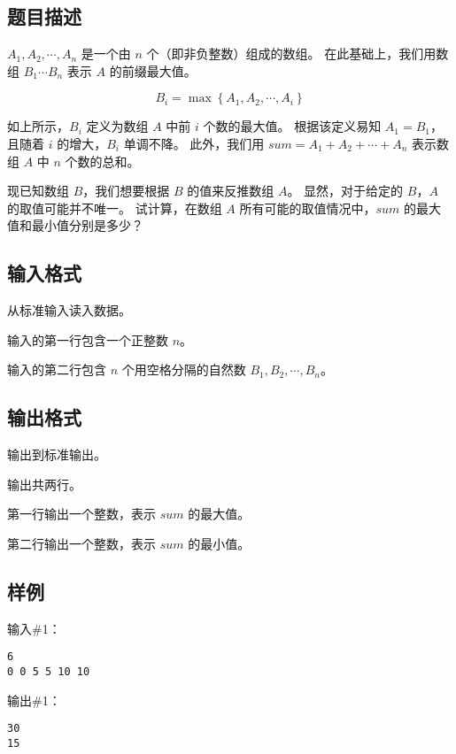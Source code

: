 \subsection*{题目描述}

$A_1, A_2, \cdots, A_n$ 是一个由 $n$ 个{}（即非负整数）组成的数组。
在此基础上，我们用数组 $B_1 \cdots B_n$ 表示 $A$ 的前缀最大值。

\begin{equation*}
    B_i = \max \left\{ A_1, A_2,  \cdots, A_i \right\}
\end{equation*}

如上所示，$B_i$ 定义为数组 $A$ 中前 $i$ 个数的最大值。
根据该定义易知 $A_1 = B_1$，且随着 $i$ 的增大，$B_i$ 单调不降。
此外，我们用 $sum = A_1 + A_2 + \cdots + A_n$ 表示数组 $A$ 中 $n$ 个数的总和。

现已知数组 $B$，我们想要根据 $B$ 的值来反推数组 $A$。
显然，对于给定的 $B$，$A$ 的取值可能并不唯一。
试计算，在数组 $A$ 所有可能的取值情况中，$sum$ 的最大值和最小值分别是多少？

\subsection*{输入格式}

从标准输入读入数据。

输入的第一行包含一个正整数 $n$。

输入的第二行包含 $n$ 个用空格分隔的自然数 $B_1, B_2, \cdots, B_n$。

\subsection*{输出格式}

输出到标准输出。

输出共两行。

第一行输出一个整数，表示 $sum$ 的最大值。

第二行输出一个整数，表示 $sum$ 的最小值。

\subsection*{样例}

输入\#1：

\begin{lstlisting}
6
0 0 5 5 10 10
\end{lstlisting}

输出\#1：

\begin{lstlisting}
30
15
\end{lstlisting}

